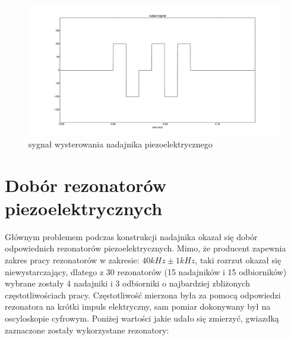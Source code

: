  \begin{figure}[h!]
    \centering
    \includegraphics[width=1.15\textwidth, trim= 47mm 0mm 0mm 0mm,clip]{output_signal}
    \caption{sygnał wysterowania nadajnika piezoelektrycznego}
    \label{fig:output_signal}
\end{figure}


\section{Dobór rezonatorów piezoelektrycznych}
Głównym problemem podczas konstrukcji nadajnika okazał się dobór odpowiednich rezonatorów piezoelektrycznych.
Mimo, że producent zapewnia zakres pracy rezonatorów w zakresie: $40 kHz \pm 1kHz$, taki rozrzut okazał się niewystarczający, 
dlatego z 30 rezonatorów (15 nadajników i 15 odbiorników) wybrane zostały 4 nadajniki i 3 odbiorniki o najbardziej 
zbliżonych częstotliwościach pracy. Częstotliwość mierzona była za pomocą odpowiedzi rezonatora na 
krótki impuls elektryczny, sam pomiar dokonywany był na oscyloskopie cyfrowym. Poniżej wartości jakie udało się zmierzyć,
gwiazdką zaznaczone zostały wykorzystane rezonatory:

